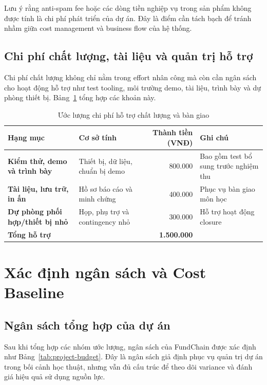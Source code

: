 Lưu ý rằng anti-spam fee hoặc các dòng tiền nghiệp vụ trong sản phẩm không được tính là chi phí phát triển của dự án. Đây là điểm cần tách bạch để tránh nhầm giữa cost management và business flow của hệ thống.

\subsection{Chi phí chất lượng, tài liệu và quản trị hỗ trợ}

Chi phí chất lượng không chỉ nằm trong effort nhân công mà còn cần ngân sách cho hoạt động hỗ trợ như test tooling, môi trường demo, tài liệu, trình bày và dự phòng thiết bị. Bảng~\ref{tab:support-cost-estimate} tổng hợp các khoản này.

\begin{table}[H]
\centering
\caption{Ước lượng chi phí hỗ trợ chất lượng và bàn giao}
\label{tab:support-cost-estimate}
\begin{tabularx}{\textwidth}{| >{\bfseries}p{4.8cm} | p{4cm} | r | X |}
\hline
Hạng mục & Cơ sở tính & Thành tiền (VNĐ) & Ghi chú \\
\hline
Kiểm thử, demo và trình bày & Thiết bị, dữ liệu, chuẩn bị demo & 800.000 & Bao gồm test bổ sung trước nghiệm thu \\ \hline
Tài liệu, lưu trữ, in ấn & Hồ sơ báo cáo và minh chứng & 400.000 & Phục vụ bàn giao môn học \\ \hline
Dự phòng phối hợp/thiết bị nhỏ & Họp, phụ trợ và contingency nhỏ & 300.000 & Hỗ trợ hoạt động closure \\
\hline
\textbf{Tổng hỗ trợ} &  & \textbf{1.500.000} &  \\
\hline
\end{tabularx}
\end{table}

\fi
\section{Xác định ngân sách và Cost Baseline}

\subsection{Ngân sách tổng hợp của dự án}

Sau khi tổng hợp các nhóm ước lượng, ngân sách của FundChain được xác định như Bảng~\ref{tab:project-budget}. Đây là ngân sách giả định phục vụ quản trị dự án trong bối cảnh học thuật, nhưng vẫn đủ cấu trúc để theo dõi variance và đánh giá hiệu quả sử dụng nguồn lực.

